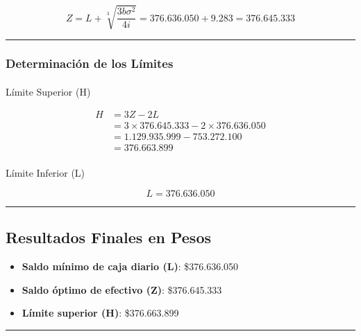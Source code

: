\documentclass[
  letterpaper,
  DIV=11,
  numbers=noendperiod]{scrartcl}
\makeatletter
\let\oldparagraph\paragraph
\renewcommand{\paragraph}{
    \@ifstar
      \xxxParagraphStar
      \xxxParagraphNoStar
  }
\newcommand{\xxxParagraphStar}[1]{\oldparagraph*{#1}\mbox{}}
\newcommand{\xxxParagraphNoStar}[1]{\oldparagraph{#1}\mbox{}}
\providecommand{\tightlist}{%
  \setlength{\itemsep}{0pt}\setlength{\parskip}{0pt}}\usepackage{longtable,booktabs,array}
\makeatother
\begin{document}
\[
Z = L + \sqrt[3]{\dfrac{3b\sigma^2}{4i}} = 376.636.050 + 9.283 = 376.645.333
\]

\begin{center}\rule{0.5\linewidth}{0.5pt}\end{center}

\subsubsection{Determinación de los
Límites}\label{determinaciuxf3n-de-los-luxedmites}

\paragraph{Límite Superior (H)}\label{luxedmite-superior-h}

\[
\begin{align*}
H &= 3Z - 2L \\
  &= 3 \times 376.645.333 - 2 \times 376.636.050 \\
  &= 1.129.935.999 - 753.272.100 \\
  &= 376.663.899
\end{align*}
\]

\paragraph{Límite Inferior (L)}\label{luxedmite-inferior-l}

\[
L = 376.636.050
\]

\begin{center}\rule{0.5\linewidth}{0.5pt}\end{center}

\subsection{Resultados Finales en
Pesos}\label{resultados-finales-en-pesos}

\begin{itemize}
\tightlist
\item
  \textbf{Saldo mínimo de caja diario (L)}: \$376.636.050
\item
  \textbf{Saldo óptimo de efectivo (Z)}: \$376.645.333
\item
  \textbf{Límite superior (H)}: \$376.663.899
\end{itemize}

\begin{center}\rule{0.5\linewidth}{0.5pt}\end{center}
\end{document}
